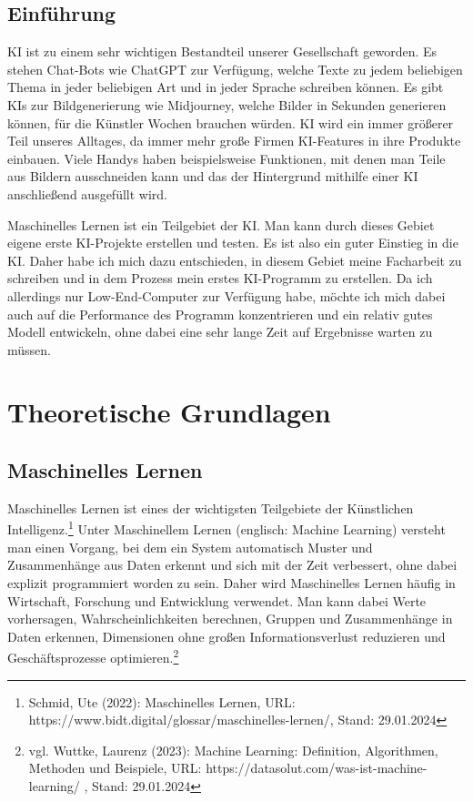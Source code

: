 \documentclass[11pt,oneside]{report}
\begin{document}


\setcounter{page}{2}
\tableofcontents

\listoffigures

\newpage


\section{Einführung}
KI ist zu einem sehr wichtigen Bestandteil unserer Gesellschaft geworden. Es stehen Chat-Bots wie ChatGPT zur Verfügung, welche Texte zu jedem beliebigen Thema in jeder beliebigen Art und in jeder Sprache schreiben können. Es gibt KIs zur Bildgenerierung wie Midjourney, welche Bilder in Sekunden generieren können, für die Künstler Wochen brauchen würden. KI wird ein immer größerer Teil unseres Alltages, da immer mehr große Firmen KI-Features in ihre Produkte einbauen. Viele Handys haben beispielsweise Funktionen, mit denen man Teile aus Bildern ausschneiden kann und das der Hintergrund mithilfe einer KI anschließend ausgefüllt wird.

Maschinelles Lernen ist ein Teilgebiet der KI. Man kann durch dieses Gebiet eigene erste KI-Projekte erstellen und testen. Es ist also ein guter Einstieg in die KI. Daher habe ich mich dazu entschieden, in diesem Gebiet meine Facharbeit zu schreiben und in dem Prozess mein erstes KI-Programm zu erstellen. Da ich allerdings nur Low-End-Computer zur Verfügung habe, möchte ich mich dabei auch auf die Performance des Programm konzentrieren und ein relativ gutes Modell entwickeln, ohne dabei eine sehr lange Zeit auf Ergebnisse warten zu müssen.


\chapter{Theoretische Grundlagen}

\section{Maschinelles Lernen}
Maschinelles Lernen ist eines der wichtigsten Teilgebiete der Künstlichen Intelligenz.\footnote{Schmid, Ute (2022): Maschinelles Lernen, URL: https://www.bidt.digital/glossar/maschinelles-lernen/, Stand: 29.01.2024} Unter Maschinellem Lernen (englisch: Machine Learning) versteht man einen Vorgang, bei dem ein System automatisch Muster und Zusammenhänge aus Daten erkennt und sich mit der Zeit verbessert, ohne dabei explizit programmiert worden zu sein. Daher wird Maschinelles Lernen häufig in Wirtschaft, Forschung und Entwicklung verwendet. Man kann dabei Werte vorhersagen, Wahrscheinlichkeiten berechnen, Gruppen und Zusammenhänge in Daten erkennen, Dimensionen ohne großen Informationsverlust reduzieren und Geschäftsprozesse optimieren.\footnote{vgl. Wuttke, Laurenz (2023): Machine Learning: Definition, Algorithmen, Methoden und Beispiele, URL: https://datasolut.com/was-ist-machine-learning/ , Stand: 29.01.2024}
\end{document}
